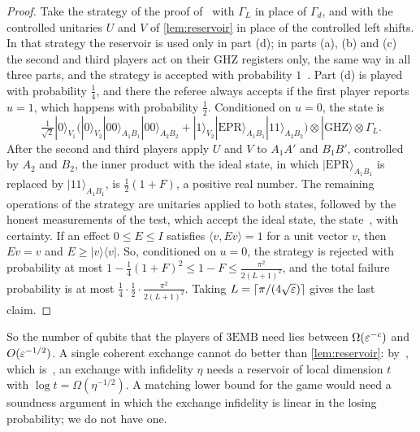 \begin{proof}
Take the strategy of the proof of~\cite[Lemma~7]{JLV20} with $\Gamma_L$ in place of $\Gamma_d$, and with the controlled
unitaries $U$ and $V$ of \cref{lem:reservoir} in place of the controlled left shifts. In that strategy the reservoir is
used only in part (d); in parts (a), (b) and (c) the second and third players act on their GHZ registers only, the same
way in all three parts, and the strategy is accepted with probability $1$~\cite[proof of Lemma~7]{JLV20}. Part (d) is
played with probability $\frac14$, and there the referee always accepts if the first player reports $u=1$, which happens
with probability $\frac12$. Conditioned on $u=0$, the state is~\cite[(10)]{JLV20}
\[
\tfrac1{\sqrt2}|0\rangle_{V_1}\bigl(|0\rangle_{V_2}|00\rangle_{A_1B_1}|00\rangle_{A_2B_2}+|1\rangle_{V_2}|\mathrm{EPR}\rangle_{A_1B_1}|11\rangle_{A_2B_2}\bigr)\otimes|\mathrm{GHZ}\rangle\otimes\Gamma_L .
\]
After the second and third players apply $U$ and $V$ to $A_1A'$ and $B_1B'$, controlled by $A_2$ and $B_2$, the inner product
with the ideal state, in which $|\mathrm{EPR}\rangle_{A_1B_1}$ is replaced by $|11\rangle_{A_1B_1}$, is $\frac12(1+F)$, a positive real
number. The remaining operations of the strategy are unitaries applied to both states, followed by the honest measurements of
the test, which accept the ideal state, the state~\cite[(12)]{JLV20}, with certainty. If an effect $0\le E\le I$ satisfies
$\langle v,Ev\rangle=1$ for a unit vector $v$, then $Ev=v$ and $E\ge|v\rangle\langle v|$. So, conditioned on $u=0$, the strategy is rejected
with probability at most $1-\frac14(1+F)^2\le1-F\le\frac{\pi^2}{2(L+1)^2}$, and the total failure probability is at most
$\frac14\cdot\frac12\cdot\frac{\pi^2}{2(L+1)^2}$. Taking $L=\lceil\pi/(4\sqrt{\varepsilon})\rceil$ gives the last claim.
\end{proof}

So the number of qubits that the players of $\mathrm{3EMB}$ need lies between $\Omega(\varepsilon^{-c})$ and $O(\varepsilon^{-1/2})$. A single
coherent exchange cannot do better than \cref{lem:reservoir}: by~\cite[Fact~8]{JLV20}, which is~\cite[Fact~5.7]{RV15}, an
exchange with infidelity $\eta$ needs a reservoir of local dimension $t$ with $\log t=\Omega(\eta^{-1/2})$. A matching lower
bound for the game would need a soundness argument in which the exchange infidelity is linear in the losing probability;
we do not have one.
